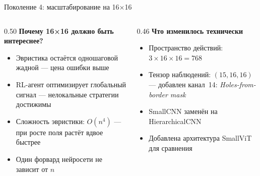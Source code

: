 \documentclass[aspectratio=169]{beamer}
\begin{document}
	\begin{frame}{Поколение 4: масштабирование на 16×16}
		\begin{columns}[t]
			\begin{column}{0.50\textwidth}
				\textbf{Почему 16×16 должно быть интереснее?}

				\medskip
				\begin{itemize}
					\item Эвристика остаётся одношаговой жадной — цена ошибки выше
					\item RL-агент оптимизирует глобальный сигнал — нелокальные стратегии достижимы
					\item Сложность эвристики: $O(n^4)$ — при росте поля растёт вдвое быстрее
					\item Один форвард нейросети не зависит от $n$
				\end{itemize}
			\end{column}
			\begin{column}{0.46\textwidth}
				\textbf{Что изменилось технически}

				\medskip
				\begin{itemize}
					\item Пространство действий: $3\times16\times16 = 768$
					\item Тензор наблюдений: $(15, 16, 16)$ — добавлен канал~14: \emph{Holes-from-border mask}
					\item SmallCNN заменён на HierarchicalCNN
					\item Добавлена архитектура SmallViT для сравнения
				\end{itemize}
			\end{column}
		\end{columns}
	\end{frame}
\end{document}
